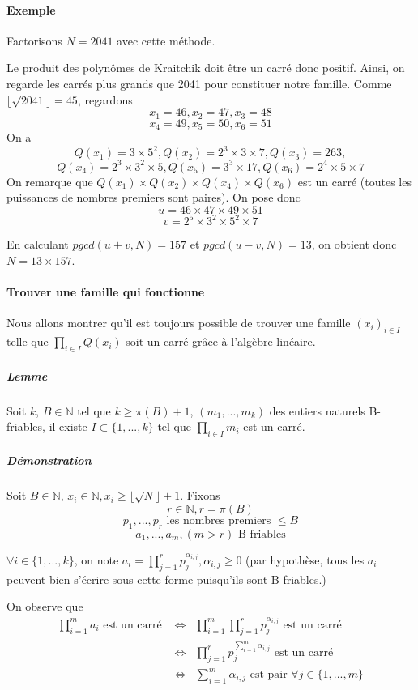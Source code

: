 \documentclass[11pt,a4paper]{article}
\begin{document}
	\paragraph{Exemple}
	Factorisons $N = 2041$ avec cette méthode.
	
	Le produit des polynômes de Kraitchik doit être un carré donc positif. Ainsi, on regarde les carrés plus grands que 2041 pour constituer notre famille.
	Comme $\lfloor \sqrt{2041} \rfloor = 45$, regardons 
	$$ x_1 = 46,  x_2 = 47, x_3 = 48$$ $$x_4 = 49, x_5 = 50, x_6 = 51$$
	On a 
	$$ Q(x_1) = 3 \times 5^2, Q(x_2) = 2^3 \times 3 \times 7, Q(x_3) = 263,$$
	$$ Q(x_4) = 2^3 \times 3^2 \times 5, Q(x_5) = 3^3 \times 17, Q(x_6) = 2^4 \times 5 \times 7$$
	On remarque que $Q(x_1) \times Q(x_2) \times Q(x_4) \times Q(x_6)$ est un carré (toutes les puissances de nombres premiers sont paires). On pose donc 
	$$u = 46 \times 47 \times 49 \times 51$$ $$v = 2^5 \times 3^2 \times 5^2 \times 7$$
	
	En calculant $pgcd(u+v, N) = 157$ et $pgcd(u-v, N) = 13$, on obtient donc $N = 13 \times 157$.
	
	\paragraph{Trouver une famille qui fonctionne}
	Nous allons montrer qu'il est toujours possible de trouver une famille $(x_i)_{i \in I}$ telle que $\prod_{i \in I} Q(x_i)$ soit un carré grâce à l'algèbre linéaire.

	\subparagraph{Lemme}
		Soit $k$, $B \in \mathbb{N}$ tel que $k \ge \pi(B) + 1$, $(m_1, ..., m_k)$ des entiers naturels B-friables,
		il existe $I \subset \{1, ..., k\}$ tel que $\prod_{i \in I} m_i$ est un carré.
		
	\subparagraph{Démonstration}
	Soit $B \in \mathbb{N}$, $x_i \in \mathbb{N}, x_i \ge \lfloor \sqrt{N} \rfloor +1$. Fixons 
	$$r \in \mathbb{N}, r = \pi(B)$$
	$$p_1, ..., p_r \text{ les nombres premiers } \le B$$
	$$a_1, ..., a_m , (m>r) \text{ B-friables}$$
	
	$\forall i \in \{1, ..., k\}$, on note $a_i = \prod_{j=1}^r p_j^{\alpha_{i,j}}, \alpha_{i,j} \ge 0$ (par hypothèse, tous les $a_i$ peuvent bien s'écrire sous cette forme puisqu'ils sont B-friables.)
	
	On observe que 
	\begin{eqnarray*}
		\prod_{i=1}^m a_i \text{ est un carré }  &\iff& \prod_{i=1}^m \prod_{j=1}^r p_j^{\alpha_{i,j}} \text{ est un carré} \\
		&\iff& \prod_{j=1}^r p_j^{\sum_{i=1}^m \alpha_{i,j}} \text{ est un carré } \\
		&\iff& \sum_{i=1}^m \alpha_{i,j} \text{ est pair } \forall j \in \{1, ..., m\}
	\end{eqnarray*}
	
\end{document}
